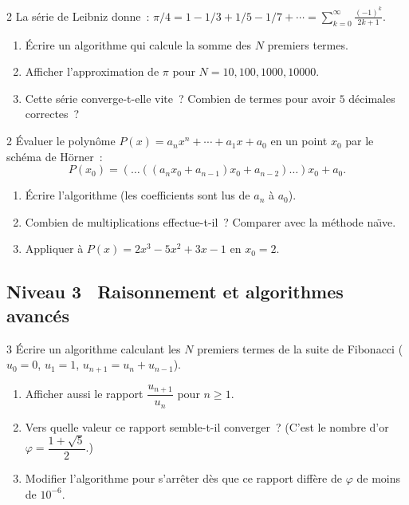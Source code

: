 \begin{exo}{2}
La s\'erie de Leibniz donne~:
$\pi/4 = 1 - 1/3 + 1/5 - 1/7 + \cdots = \displaystyle\sum_{k=0}^{\infty}\frac{(-1)^k}{2k+1}$.
\begin{enumerate}
  \item \'Ecrire un algorithme qui calcule la somme des $N$ premiers termes.
  \item Afficher l'approximation de $\pi$ pour $N = 10, 100, 1000, 10000$.
  \item Cette s\'erie converge-t-elle vite~? Combien de termes pour avoir
        $5$ d\'ecimales correctes~?
\end{enumerate}
\end{exo}

\begin{exo}{2}
\'Evaluer le polyn\^ome $P(x) = a_n x^n + \cdots + a_1 x + a_0$ en un
point $x_0$ par le sch\'ema de H\"orner~:
\[ P(x_0) = (\ldots((a_n x_0 + a_{n-1})x_0 + a_{n-2})\ldots)x_0 + a_0. \]
\begin{enumerate}
  \item \'Ecrire l'algorithme (les coefficients sont lus de $a_n$ \`a $a_0$).
  \item Combien de multiplications effectue-t-il~? Comparer avec
        la m\'ethode na\"\i ve.
  \item Appliquer \`a $P(x) = 2x^3 - 5x^2 + 3x - 1$ en $x_0 = 2$.
\end{enumerate}
\end{exo}

\subsection*{\quad Niveau 3 \textemdash\ Raisonnement et algorithmes avanc\'es}

\begin{exo}{3}
\'Ecrire un algorithme calculant les $N$ premiers termes de la suite
de Fibonacci ($u_0=0$, $u_1=1$, $u_{n+1}=u_n+u_{n-1}$).
\begin{enumerate}
  \item Afficher aussi le rapport $\dfrac{u_{n+1}}{u_n}$ pour $n \geq 1$.
  \item Vers quelle valeur ce rapport semble-t-il converger~?
        (C'est le nombre d'or $\varphi = \dfrac{1+\sqrt{5}}{2}$.)
  \item Modifier l'algorithme pour s'arr\^eter d\`es que ce rapport
        diff\`ere de $\varphi$ de moins de $10^{-6}$.
\end{enumerate}
\end{exo}

